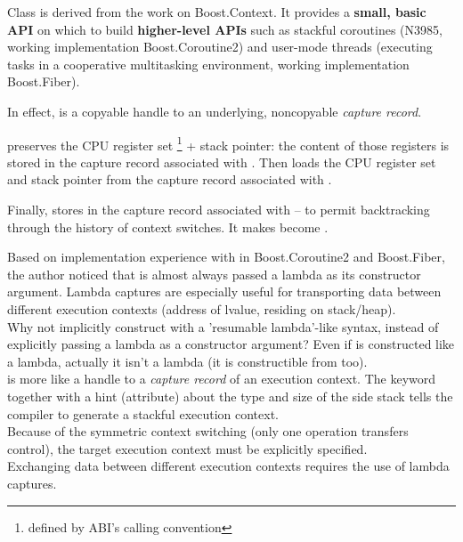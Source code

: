 \newpage
{}
Class \ectx is derived from the work on Boost.Context\cite{bcontext}. It
provides a {\bfseries small, basic API} on which to build {\bfseries
higher-level APIs} such as stackful coroutines (N3985\cite{N3985}, working
implementation Boost.Coroutine2\cite{bcoroutine2}) and user-mode threads
(executing tasks in a cooperative multitasking environment, working
implementation Boost.Fiber\cite{bfiber}).

In effect,  is a copyable handle to an underlying,
noncopyable \emph{capture record}.

 preserves the CPU register set
\footnote{defined by ABI's calling convention} + stack pointer: the content of
those registers is stored in the capture record associated with
. Then  loads the CPU register
set and stack pointer from the capture record associated with .

Finally, 
stores  in the capture record
associated with  -- to permit backtracking through the history of
context switches. It makes  become .

Based on implementation experience with  in
Boost.Coroutine2\cite{bcoroutine2} and Boost.Fiber\cite{bfiber}, the author
noticed that  is almost always passed a lambda as its
constructor argument. Lambda captures are especially useful for transporting
data between different execution contexts (address of lvalue, residing on
stack/heap).\\
Why not implicitly construct \ectx with a 'resumable lambda'-like
syntax\cite{N4244}, instead of explicitly passing a lambda as a constructor
argument? Even if \ectx is constructed like a lambda, actually it isn't a
lambda (it is constructible from \ectxcurrent too).\\
\ectx is more like a handle to a \emph{capture record} of an execution
context.
The keyword \resumable together with a hint (attribute) about the type and size
of the side stack tells the compiler to generate a stackful execution context.\\
Because of the symmetric context switching (only one operation transfers
control), the target execution context must be explicitly specified.\\
Exchanging data between different execution contexts requires the use of lambda
captures.

